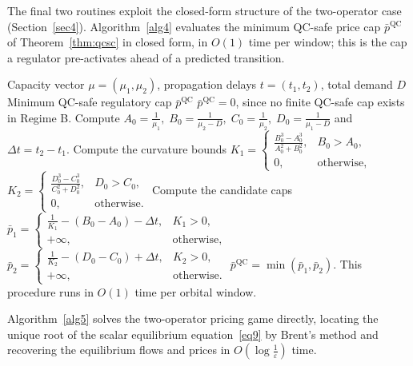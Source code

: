 \documentclass[review,3p,authoryear]{elsarticle}
\begin{document}
The final two routines exploit the closed-form structure of the two-operator case (Section~\ref{sec4}). Algorithm~\ref{alg4} evaluates the minimum QC-safe price cap $\bar{p}^{\mathrm{QC}}$ of Theorem~\ref{thm:qcsc} in closed form, in $O(1)$ time per window; this is the cap a regulator pre-activates ahead of a predicted transition.

\begin{algorithm}[!h]
\caption{QC-Safe Regulatory Cap for the Two-Operator Case}
\label{alg4}
\begin{algorithmic}[1]
\Require Capacity vector ${\mu}=({\mu}_{1},{\mu}_{2})$, propagation delays $t=(t_{1},t_{2})$, total demand $D$
\Ensure Minimum QC-safe regulatory cap $\bar{p}^{\mathrm{QC}}$
    \State \Return $\bar{p}^{\mathrm{QC}} = 0$, since no finite QC-safe cap exists in Regime B.
\EndIf
\State Compute
\Statex $A_{0}=\frac{1}{{\mu}_{1}},\; B_{0}=\frac{1}{{\mu}_{2}-D},\; C_{0}=\frac{1}{{\mu}_{2}},\; D_{0}=\frac{1}{{\mu}_{1}-D}$
\Statex and ${\Delta}t = t_{2}-t_{1}$.
\State Compute the curvature bounds
\Statex $K_{1}=\begin{cases}
    \frac{B_{0}^{3}-A_{0}^{3}}{A_{0}^{2}+B_{0}^{2}}, & B_{0}>A_{0}, \\
    0, & \text{otherwise},
\end{cases}$
\Statex $K_{2}=\begin{cases}
    \frac{D_{0}^{3}-C_{0}^{3}}{C_{0}^{2}+D_{0}^{2}}, & D_{0}>C_{0}, \\
    0, & \text{otherwise}.
\end{cases}$
\State Compute the candidate caps
\Statex $\bar{p}_{1}=\begin{cases}
    \frac{1}{K_{1}}-(B_{0}-A_{0})-{\Delta}t, & K_{1}>0, \\
    +{\infty}, & \text{otherwise},
\end{cases}$
\Statex $\bar{p}_{2}=\begin{cases}
    \frac{1}{K_{2}}-(D_{0}-C_{0})+{\Delta}t, & K_{2}>0, \\
    +{\infty}, & \text{otherwise}.
\end{cases}$
\State \Return $\bar{p}^{\mathrm{QC}} = \min(\bar{p}_{1},\bar{p}_{2})$.
\Statex This procedure runs in $O(1)$ time per orbital window.
\end{algorithmic}
\end{algorithm}

Algorithm~\ref{alg5} solves the two-operator pricing game directly, locating the unique root of the scalar equilibrium equation~\eqref{eq9} by Brent's method and recovering the equilibrium flows and prices in $O(\log\frac{1}{{\varepsilon}})$ time.
\end{document}
